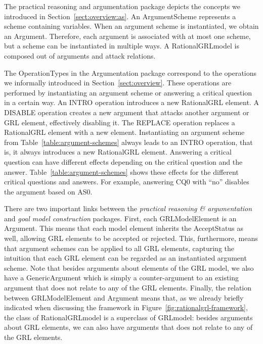 The practical reasoning and argumentation package depicts the concepts we introduced in Section~\ref{sect:overview:as}. An \textsf{ArgumentScheme} represents a scheme containing variables. When an argument scheme is instantiated, we obtain an \textsf{Argument}. Therefore, each argument is associated with at most one scheme, but a scheme can be instantiated in multiple ways. A \textsf{RationalGRLmodel} is composed out of arguments and attack relations.

The \textsf{OperationTypes} in the Argumentation package correspond to the operations we informally introduced in Section~\ref{sect:overview}. These operations are performed by instantiating an argument scheme or answering a critical question in a certain way. An \textsf{INTRO} operation introduces a new RationalGRL element. A \textsf{DISABLE} operation creates a new argument that attacks another argument or GRL element, effectively disabling it. The \textsf{REPLACE} operation replaces a RationalGRL element with a new element. Instantiating an argument scheme from Table~\ref{table:argument-schemes} always leads to an \textsf{INTRO} operation, that is, it always introduces a new RationalGRL element. Answering a critical question can have different effects depending on the critical question and the answer. Table~\ref{table:argument-schemes} shows these effects for the different critical questions and answers. For example, answering CQ0 with ``no'' disables the argument based on AS0. 

There are two important links between the \emph{practical reasoning \& argumentation} and \emph{goal model construction} packages. First, each \textsf{GRLModelElement} is an \textsf{Argument}. This means that each model element inherits the \textsf{AcceptStatus} as well, allowing GRL elements to be accepted or rejected. This, furthermore, means that argument schemes can be applied to all GRL elements, capturing the intuition that each GRL element can be regarded as an instantiated argument scheme. Note that besides arguments about elements of the GRL model, we also have a \textsf{GenericArgument} which is simply a counter-argument to an existing argument that does not relate to any of the GRL elements. Finally, the relation between \textsf{GRLModelElement} and \textsf{Argument} means that, as we already briefly indicated when discussing the framework in Figure~\ref{fig:rationalgrl-framework}, the class of \textsf{RationalGRLmodel} is a superclass of \textsf{GRLmodel}: besides arguments about GRL elements, we can also have arguments that does not relate to any of the GRL elements.

